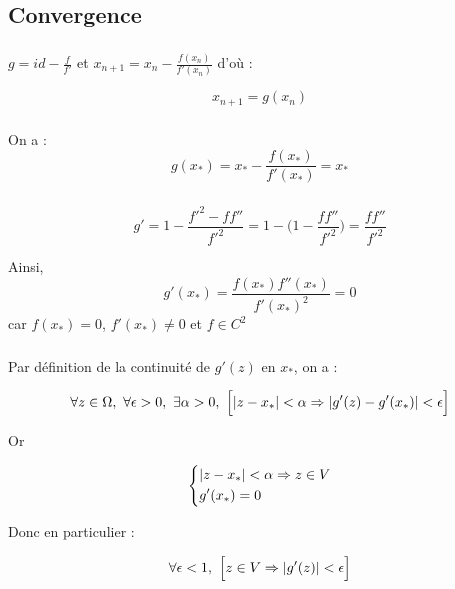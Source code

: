 \documentclass{article}
\DeclarePairedDelimiter\abs{\lvert}{\rvert}%
\begin{document}
\subsection{Convergence}

\subsubsection{}

$g = id - \frac{f}{f'}$ et $x_{n + 1} = x_n - \frac{f(x_n)}{f'(x_n)}$ d'où : 

$$x_{n + 1} = g(x_n)$$

\subsubsection{}

On a : 
$$g(x_*) = x_* - \frac{f(x_*)}{f'(x_*)} = x_*$$

\subsubsection{}

$$g' = 1 - \frac{f'^{2} - ff''}{f'^{2}} = 1 - \Big(1 - \frac{ff''}{f'^2}\Big) = \frac{ff''}{f'^2}$$

Ainsi, $$g'(x_*) = \frac{f(x_*) f''(x_*)}{f'(x_*)^2} = 0$$ car $f(x_*) = 0$, $f'(x_*) \neq 0$ et $f \in C^2$

\subsubsection{}

Par définition de la continuité de $g'(z)$ en $x_*$, on a :

$$\forall z \in \Omega, \ \forall \epsilon > 0, \ \exists \alpha > 0, \ \Big[ \abs{z - x_*} < \alpha \Rightarrow
\abs{g'(z) - g'(x_*)} < \epsilon \Big]$$

Or 

\begin{equation*}
    \left \{
    \begin{aligned}
      & \abs{z - x_*} < \alpha \Rightarrow z \in V\\
      & g'(x_*) = 0
    \end{aligned} \right.
\end{equation*} 

Donc en particulier :

$$\forall \epsilon < 1, \ \Big[z \in V \Rightarrow \abs{g'(z)} < \epsilon \Big]$$
\end{document}
